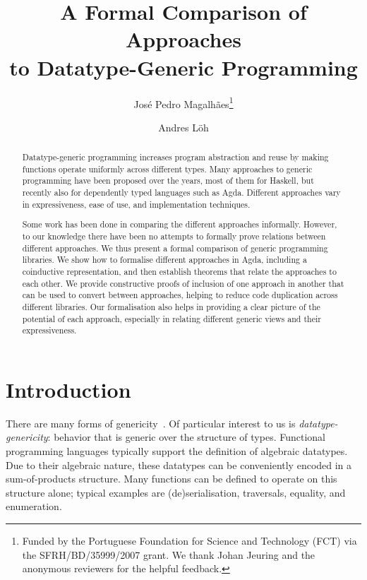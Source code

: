 \documentclass[submission,copyright,creativecommons,sharealike,noncommercial]{eptcs}
\title{A Formal Comparison of Approaches\\ to Datatype-Generic Programming}
\author{Jos\'e Pedro Magalh\~aes\thanks{Funded by the Portuguese
Foundation for Science and Technology (FCT) via the SFRH/BD/35999/2007 grant.
We thank Johan Jeuring and the anonymous reviewers for the helpful feedback.}
\institute{Utrecht University}
\email{jpm@cs.uu.nl}
\and
Andres L\"oh
\institute{Well-Typed LLP}
\email{andres@well-typed.com}
}
\begin{document}
\maketitle


\begin{abstract}
Datatype-generic programming increases program abstraction and reuse by making 
functions operate uniformly across different types.
Many approaches to generic 
programming have been proposed over the years, most of them for Haskell, but 
recently also for dependently typed languages such as Agda. Different approaches 
vary in expressiveness, ease of use, and implementation techniques. 

Some work has been done in comparing the different approaches informally.
However, to our 
knowledge there have been no attempts to formally prove relations between 
different approaches.
We thus present a formal comparison of generic programming libraries. We show
how to formalise different approaches in Agda, including a coinductive
representation, and then establish theorems that relate the approaches to
each other.
We provide constructive proofs of inclusion of one approach in another that can
be used to convert between approaches, helping to reduce code duplication 
across different libraries. Our formalisation also helps in providing a clear
picture of the potential of each approach, especially in relating different 
generic views and their expressiveness. 
\end{abstract}


\section{Introduction}
There are many forms of genericity~\cite{Gibbons2007:Datatype}. Of particular
interest to us is \emph{datatype-genericity}: behavior that is generic over the
structure of types. Functional programming languages typically support the 
definition of algebraic datatypes. Due to their algebraic nature, these
datatypes can be conveniently encoded in a sum-of-products structure. Many
functions can be defined to operate on this structure alone; typical examples
are (de)serialisation, traversals, equality, and enumeration.
\end{document}
